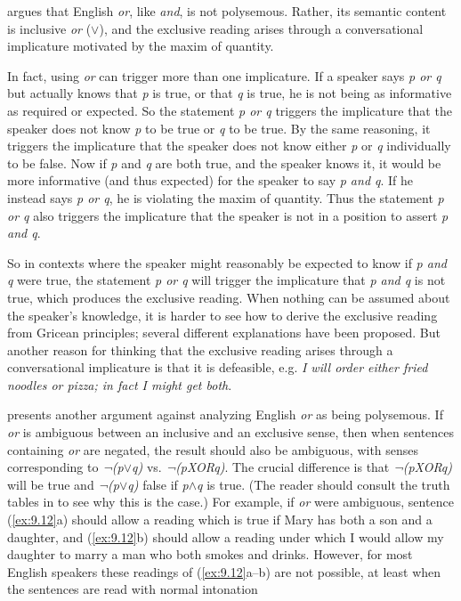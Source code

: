 \citet{Grice1978} argues that English \textit{or}, like \textit{and}, is not polysemous. Rather, its semantic content is inclusive \textit{or} ($\vee$), and the exclusive reading arises through a conversational implicature motivated by the maxim of quantity.



In fact, using \textit{or} can trigger more than one implicature. If a speaker says \textit{p or q} but actually knows that \textit{p} is true, or that \textit{q} is true, he is not being as informative as required or expected. So the statement \textit{p or q} triggers the implicature that the speaker does not know \textit{p} to be true or \textit{q} to be true. By the same reasoning, it triggers the implicature that the speaker does not know either \textit{p} or \textit{q} individually to be false. Now if \textit{p} and \textit{q} are both true, and the speaker knows it, it would be more informative (and thus expected) for the speaker to say \textit{p and q}. If he instead says \textit{p or q}, he is violating the maxim of quantity. Thus the statement \textit{p or q} also triggers the implicature that the speaker is not in a position to assert \textit{p and q}.



So in contexts where the speaker might reasonably be expected to know if \textit{p and q} were true, the statement \textit{p or q} will trigger the implicature that \textit{p and q} is not true, which produces the exclusive reading. When nothing can be assumed about the speaker’s knowledge, it is harder to see how to derive the exclusive reading from Gricean principles; several different explanations have been proposed. But another reason for thinking that the exclusive reading arises through a conversational implicature is that it is defeasible, e.g. \textit{I will order either fried noodles or pizza; in fact I might get both}.



\citet[81--82]{Gazdar1979} presents another argument against analyzing English \textit{or} as being polysemous. If \textit{or} is ambiguous between an inclusive and an exclusive sense, then when sentences containing \textit{or} are negated, the result should also be ambiguous, with senses corresponding to \textit{¬(p$\vee$q)} vs. \textit{¬(pXORq)}. The crucial difference is that \textit{¬(pXORq)} will be true and \textit{¬(p$\vee$q)} false if \textit{p$\wedge$q} is true. (The reader should consult the truth tables in  to see why this is the case.) For example, if \textit{or} were ambiguous, sentence (\ref{ex:9.12}a) should allow a reading which is true if Mary has both a son and a daughter, and (\ref{ex:9.12}b) should allow a reading under which I would allow my daughter to marry a man who both smokes and drinks. However, for most English speakers these readings of (\ref{ex:9.12}a--b) are not possible, 
at least when the sentences are read with normal intonation
 
